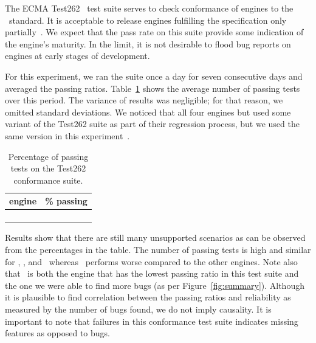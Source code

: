 \documentclass[smallextended]{svjour3}
\begin{document}
The ECMA Test262~\cite{ecma262-conformance-suite} test suite serves to
check conformance of engines to the \js\ standard. It is
acceptable to release engines fulfilling the specification only
partially~\cite{kangax}. We expect that the pass rate on this suite
provide some indication of the engine's maturity. In the limit, it is
not desirable to flood bug reports on engines at early stages of
development.

For this experiment, we ran the suite once a day for seven consecutive
days and averaged the passing ratios. Table~\ref{tab:test262} shows
the average number of passing tests over this period. The variance of
results was negligible; for that reason, we omitted standard
deviations. We noticed that all four engines but \chakra{} used some
variant of the Test262 suite as part of their regression process, but
we used the same version in this
experiment~\cite{ecma262-conformance-suite}.

\begin{table}
  \centering
  \caption{\label{tab:test262}Percentage of passing tests on
    the Test262 conformance suite.}
  \begin{tabular}{rr}
    \toprule
    engine & \% passing \\
    \midrule
    \jsc{} & \percentSuiteTestJSC{}\\
    \veight{} & \percentSuiteTestVeight{} \\
    \chakra{} & \percentSuiteTestChakra{} \\
    \smonkey{} & \percentSuiteTestSM{} \\
    \bottomrule
  \end{tabular}
\end{table}

Results show that there are still many unsupported scenarios as can be observed from the
percentages in the table. The number of passing tests is high and
similar for \jsc{}, \veight{}, and \smonkey\ whereas \chakra\ performs
worse compared to the other engines. Note also that \chakra\ is both
the engine that has the lowest passing ratio in this test suite and
the one we were able to find more bugs (as per
Figure~\ref{fig:summary}). Although it is plausible to find
correlation between the passing ratios and reliability as measured by
the number of bugs found, we do not imply causality. It is important
to note that failures in this conformance test suite indicates missing
features as opposed to bugs.
\end{document}
